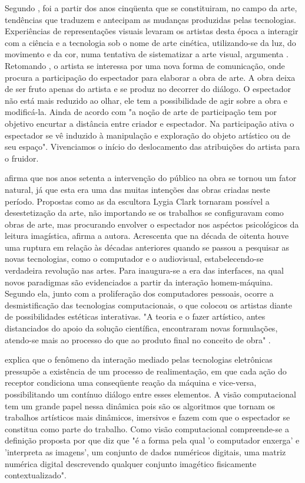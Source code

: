 Segundo , foi a partir dos anos cinqüenta que se constituiram, no campo da arte, tendências que traduzem e antecipam as mudanças produzidas pelas tecnologias. Experiências de representações visuais levaram os artistas desta época a interagir com a ciência e a tecnologia sob o nome de arte cinética, utilizando-se da luz, do movimento e da cor, numa tentativa de sistematizar a arte visual, argumenta . Retomando , o artista se interessa por uma nova forma de comunicação, onde procura a participação do espectador para elaborar a obra de arte. A obra deixa de ser fruto apenas do artista e se produz no decorrer do diálogo. O espectador não está mais reduzido ao olhar, ele tem a possibilidade de agir sobre a obra e modificá-la. Ainda de acordo com  "a noção de arte de participação tem por objetivo encurtar a distância entre criador e espectador. Na participação ativa o espectador se vê induzido à manipulação e exploração do objeto artístico ou de seu espaço". Vivenciamos o início do deslocamento das atribuições do artista para o fruidor. 

 afirma que nos anos setenta a intervenção do público na obra se tornou um fator natural, já que esta era uma das muitas intenções das obras criadas neste período. Propostas como as da escultora Lygia Clark tornaram possível a desestetização da arte, não importando se os trabalhos se configuravam como obras de arte, mas procurando envolver o espectador nos aspéctos psicológicos da leitura imagística, afirma a autora. Acrescenta que na década de oitenta houve uma ruptura em relação às décadas anteriores quando se passou a pesquisar as novas tecnologias, como o computador e o audiovisual, estabelecendo-se verdadeira revolução nas artes. Para  inaugura-se a era das interfaces, na qual novos paradigmas são evidenciados a partir da interação homem-máquina. Segundo ela, junto com a proliferação dos computadores pessoais, ocorre a desmistificação das tecnologias computacionais, o que colocou os artistas diante de possibilidades estéticas interativas. "A teoria e o fazer artístico, antes distanciados do apoio da solução científica, encontraram novas formulações, atendo-se mais ao processo do que ao produto final no conceito de obra" \cite[p. 78]{rahde}.

 explica que o fenômeno da interação mediado pelas tecnologias eletrônicas pressupõe a existência de um processo de realimentação, em que cada ação do receptor condiciona uma conseqüente reação da máquina e vice-versa, possibilitando um contínuo diálogo entre esses elementos. A visão computacional tem um grande papel nessa dinâmica pois são os algoritmos que tornam os trabalhos artísticos mais dinâmicos, imersivos e fazem com que o espectador se constitua como parte do trabalho. Como visão computacional compreende-se a definição proposta por  que diz que "é a forma pela qual 'o computador enxerga' e 'interpreta as imagens', um conjunto de dados numéricos digitais, uma matriz numérica digital descrevendo qualquer conjunto imagético fisicamente contextualizado".

